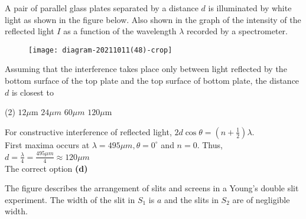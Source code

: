\begin{enumerate}
\begin{minipage}{\textwidth}
	\item A pair of parallel glass plates separated by a distance $d$ is illuminated by white light as shown in the figure below. Also shown in the graph of the intensity of the reflected light $I$ as a function of the wavelength $\lambda$ recorded by a spectrometer.
	\begin{figure}[H]
		\centering
		\texttt{[image: diagram-20211011(48)-crop]}
	\end{figure}
	Assuming that the interference takes place only between light reflected by the bottom surface of the top plate and the top surface of bottom plate, the distance $d$ is closest to
\end{minipage}
\begin{tasks}(2)
	\task[\textbf{A.}] $12 \mu \mathrm{m}$
	\task[\textbf{B.}] $24 \mu m$
	\task[\textbf{C.}] $60 \mu m$
	\task[\textbf{D.}] $120 \mu \mathrm{m}$
\end{tasks}
\begin{answer}
	For constructive interference of reflected light, $2 d \cos \theta=\left(n+\frac{1}{2}\right) \lambda$.\\
	First maxima occurs at $\lambda=495 \mu m, \theta=0^{\circ}$ and $n=0 .$ Thus, $d=\frac{\lambda}{4}=\frac{495 \mu m}{4} \approx 120 \mu m$	\\
	The correct option \textbf{(d)}
\end{answer}
\begin{minipage}{\textwidth}
	\item The figure describes the arrangement of slits and screens in a Young's double slit experiment. The width of the slit in $S_{1}$ is $a$ and the slits in $S_{2}$ are of negligible width.
	

\end{minipage}
\end{enumerate}
